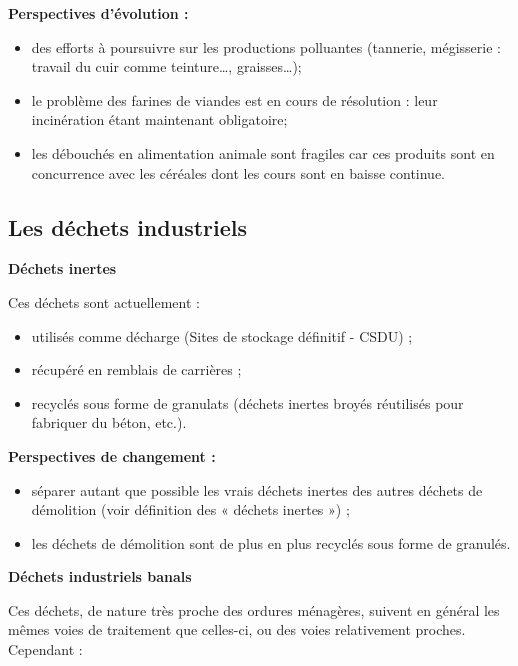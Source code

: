 \vspace{0.3cm}
\textbf{Perspectives d’évolution :}
\vspace{0.3cm}

\begin{itemize}
\item des efforts à poursuivre sur les productions polluantes (tannerie, mégisserie : travail du cuir comme teinture…, graisses…);
\item le problème des farines de viandes est en cours de résolution : leur incinération étant maintenant obligatoire;
\item les débouchés en alimentation animale sont fragiles car ces produits sont en concurrence avec les céréales dont les cours sont en baisse continue.
\end{itemize}

\subsection{Les déchets industriels}

\textbf{Déchets inertes}
\vspace{0.3cm}

Ces déchets sont actuellement :
\begin{itemize}
\item utilisés comme décharge (Sites de stockage définitif - CSDU) ;
\item récupéré en remblais de carrières ;
\item recyclés sous forme de granulats (déchets inertes broyés réutilisés pour fabriquer du béton, etc.).
\end{itemize}

\textbf{Perspectives de changement :}
\vspace{0.3cm}

\begin{itemize}
\item séparer autant que possible les vrais déchets inertes des autres déchets de démolition (voir définition des « déchets inertes ») ;
\item les déchets de démolition sont de plus en plus recyclés sous forme de granulés.
\end{itemize}

\vspace{0.3cm}
\textbf{Déchets industriels banals} 
\vspace{0.3cm}

Ces déchets, de nature très proche des ordures ménagères, suivent en général les mêmes voies de traitement que celles-ci, ou des voies relativement proches. Cependant :


